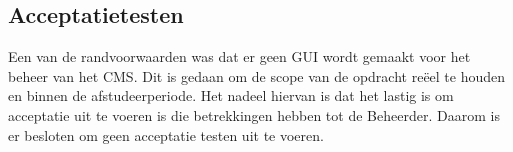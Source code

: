\subsection{Acceptatietesten}
Een van de randvoorwaarden was dat er geen \gls{GUI} wordt gemaakt voor het beheer van het CMS.
Dit is gedaan om de scope van de opdracht reëel te houden en binnen de afstudeerperiode.
Het nadeel hiervan is dat het lastig is om acceptatie uit te voeren is die betrekkingen hebben tot de \gls{Beheerder}.
Daarom is er besloten om geen acceptatie testen uit te voeren.
